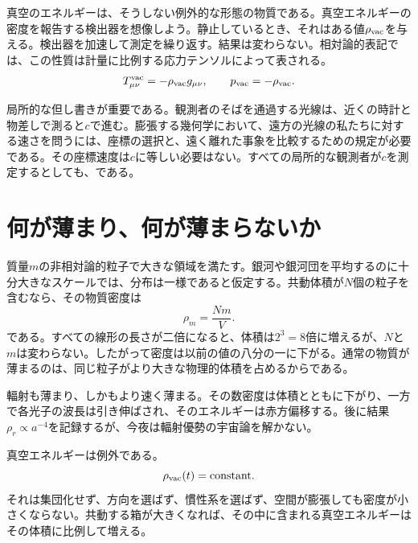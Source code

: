 真空のエネルギーは、そうしない例外的な形態の物質である。真空エネルギーの密度を報告する検出器を想像しよう。静止しているとき、それはある値\(\rho_{\rm vac}\)を与える。検出器を加速して測定を繰り返す。結果は変わらない。相対論的表記では、この性質は計量に比例する応力テンソルによって表される。
\begin{equation}
T_{\mu\nu}^{\rm vac}=-\rho_{\rm vac}g_{\mu\nu},
\qquad
p_{\rm vac}=-\rho_{\rm vac}.
\label{eq:l08-vacuum-stress}
\end{equation}

局所的な但し書きが重要である。観測者のそばを通過する光線は、近くの時計と物差しで測ると\(c\)で進む。膨張する幾何学において、遠方の光線の私たちに対する速さを問うには、座標の選択と、遠く離れた事象を比較するための規定が必要である。その座標速度は\(c\)に等しい必要はない。すべての局所的な観測者が\(c\)を測定するとしても、である。

\begin{classroomqa}
\end{classroomqa}

\section{何が薄まり、何が薄まらないか}

質量\(m\)の非相対論的粒子で大きな領域を満たす。銀河や銀河団を平均するのに十分大きなスケールでは、分布は一様であると仮定する。共動体積が\(N\)個の粒子を含むなら、その物質密度は
\begin{equation}
\rho_m=\frac{Nm}{V}.
\end{equation}
である。すべての線形の長さが二倍になると、体積は\(2^3=8\)倍に増えるが、\(N\)と\(m\)は変わらない。したがって密度は以前の値の八分の一に下がる。通常の物質が薄まるのは、同じ粒子がより大きな物理的体積を占めるからである。

輻射も薄まり、しかもより速く薄まる。その数密度は体積とともに下がり、一方で各光子の波長は引き伸ばされ、そのエネルギーは赤方偏移する。後に結果\(\rho_r\propto a^{-4}\)を記録するが、今夜は輻射優勢の宇宙論を解かない。

真空エネルギーは例外である。
\begin{equation}
\rho_{\rm vac}(t)=\text{constant}.
\label{eq:l08-rho-vac-constant}
\end{equation}
それは集団化せず、方向を選ばず、慣性系を選ばず、空間が膨張しても密度が小さくならない。共動する箱が大きくなれば、その中に含まれる真空エネルギーはその体積に比例して増える。

